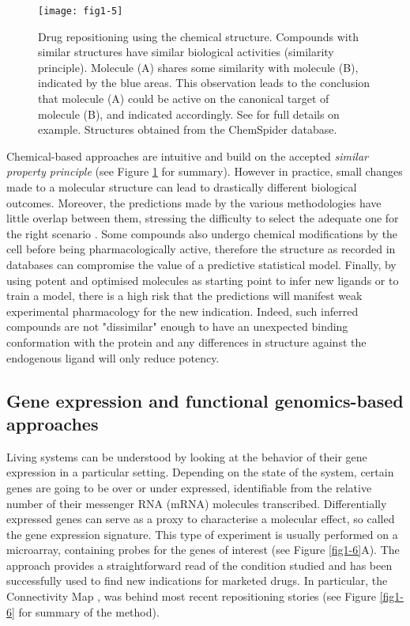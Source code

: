\begin{figure}[ht]
    \centering
    \texttt{[image: fig1-5]}
    \caption{Drug repositioning using the chemical structure. Compounds with similar structures have similar biological activities (similarity principle). Molecule (A) shares some similarity with molecule (B), indicated by the blue areas. This observation leads to the conclusion that molecule (A) could be active on the canonical target of molecule (B), and indicated accordingly. See \cite{keiser2009predicting} for full details on example. Structures obtained from the ChemSpider database.}
    \label{fig1-5}
\end{figure}

Chemical-based approaches are intuitive and build on the accepted \emph{similar property principle} (see Figure \ref{fig1-5} for summary). However in practice, small changes made to a molecular structure can lead to drastically different biological outcomes. Moreover, the predictions made by the various methodologies have little overlap between them, stressing the difficulty to select the adequate one for the right scenario \citep{eckert2007molecular}. Some compounds also undergo chemical modifications by the cell before being pharmacologically active, therefore the structure as recorded in databases can compromise the value of a predictive statistical model. Finally, by using potent and optimised molecules as starting point to infer new ligands or to train a model, there is a high risk that the predictions will manifest weak experimental pharmacology for the new indication. Indeed, such inferred compounds are not "dissimilar" enough to have an unexpected binding conformation with the protein and any differences in structure against the endogenous ligand will only reduce potency.

\subsection{Gene expression and functional genomics-based approaches}
\label{expression}

Living systems can be understood by looking at the behavior of their gene expression in a particular setting. Depending on the state of the system, certain genes are going to be over or under expressed, identifiable from the relative number of their messenger RNA (mRNA) molecules transcribed. Differentially expressed genes can serve as a proxy to characterise a molecular effect, so called the gene expression signature. This type of experiment is usually performed on a microarray, containing probes for the genes of interest (see Figure \ref{fig1-6}A). The approach provides a straightforward read of the condition studied and has been successfully used to find new indications for marketed drugs. In particular, the Connectivity Map \citep{lamb2006connectivity}, was behind most recent repositioning stories (see Figure \ref{fig1-6} for summary of the method).


